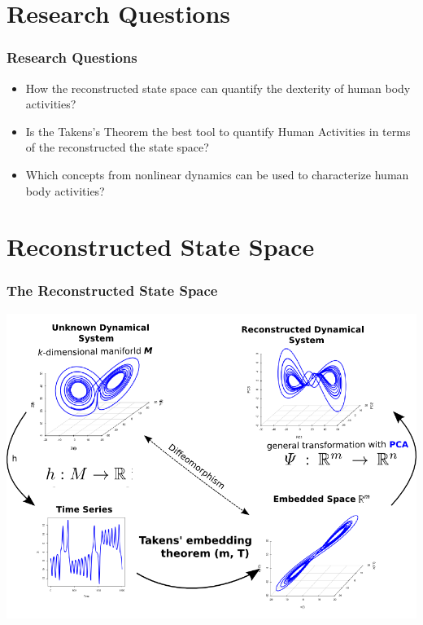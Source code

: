 \documentclass{beamer}
\begin{document}
\section{Research Questions}

\begin{frame}
	\frametitle{Research Questions}

    \begin{itemize}
    \item How the reconstructed state space can quantify the dexterity 
          of human body activities?
    \item Is the Takens's Theorem the best tool to quantify Human Activities
          in terms of the reconstructed the state space?
    \item Which concepts from nonlinear dynamics can be used to characterize
          human body activities?
    \end{itemize}

\end{frame}


\section{Reconstructed State Space}




\begin{frame}
\frametitle{The Reconstructed State Space}
\vspace{-5mm}

 \includegraphics[scale=.4]{takens_theorem_v2} 


\end{frame}
\end{document}

